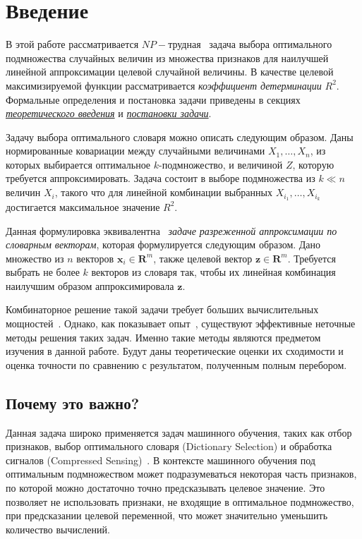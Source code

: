 \documentclass[preprint,12pt]{elsarticle}
\begin{document}



\section{Введение}
\label{S:1}

В этой работе рассматривается $NP-$трудная~\cite{chen2008np} задача выбора оптимального подмножества случайных величин из множества признаков для наилучшей линейной аппроксимации целевой случайной величины. В качестве целевой максимизируемой функции рассматривается \textit{коэффициент детерминации} $R^2$. Формальные определения и постановка задачи приведены в секциях \hyperref[sec:theory]{\textit{теоретического введения}} и \hyperref[S:2]{\textit{постановки задачи}}.

Задачу выбора оптимального словаря можно описать следующим образом. 
Даны нормированные ковариации между случайными величинами $X_1, \dots, X_n$, из которых выбирается оптимальное $k$-подмножество, и величиной $Z$, которую требуется аппроксимировать. 
Задача состоит в выборе подмножества из $k \ll n$ величин $X_i$, такого что для линейной комбинации выбранных $X_{i_1}, \dots, X_{i_k}$ достигается максимальное значение $R^2$.

Данная формулировка эквивалентна~\cite{das2008algorithms} \textit{задаче разреженной аппроксимации по словарным векторам}, которая формулируется следующим образом. Дано множество из $n$ векторов $\textbf{x}_i \in \mathbf{R}^m$, также целевой вектор $\textbf{z} \in \mathbf{R}^m$. Требуется выбрать не более $k$ векторов из словаря так, чтобы их линейная комбинация наилучшим образом аппроксимировала $\textbf{z}$.

Комбинаторное решение такой задачи требует больших вычислительных мощностей~\cite{chen2008np}. Однако, как показывает опыт~\cite{bian2017guarantees, lovasz1983submodular}, существуют эффективные неточные методы решения таких задач. Именно такие методы являются предметом изучения в данной работе. Будут даны теоретические оценки их сходимости и оценка точности по сравнению с результатом, полученным полным перебором.

\subsection{Почему это важно?}
Данная задача широко применяется задач машинного обучения, таких как отбор признаков, выбор оптимального словаря (Dictionary Selection) \cite{krause2010submodular} и обработка сигналов (Compressed Sensing)~\cite{coutino2018submodular}. В контексте машинного обучения под оптимальным подмножеством может подразумеваться некоторая часть признаков, по которой можно достаточно точно предсказывать целевое значение. Это позволяет не использовать признаки, не входящие в оптимальное подмножество, при предсказании целевой переменной, что может значительно уменьшить количество вычислений.
\end{document}
